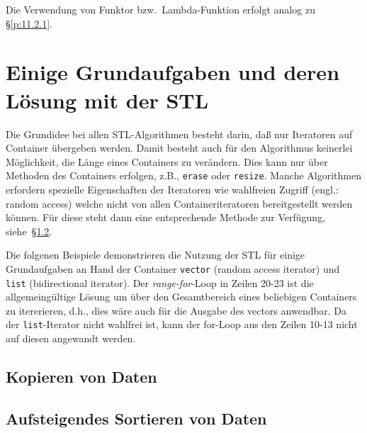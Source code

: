 Die Verwendung von Funktor bzw.\  Lambda-Funktion erfolgt analog zu \S\ref{p:11.2.1}.

\section{Einige Grundaufgaben und deren Lösung mit der STL}
\label{p:11.3}

Die Grundidee bei allen STL-Algorithmen besteht darin, daß nur Iteratoren auf Container übergeben 
werden. Damit besteht auch für den Algorithmus keinerlei Möglichkeit, die Länge eines Containers 
zu verändern. Dies kann nur über Methoden des Containers erfolgen, z.B., \verb|erase| oder \verb|resize|.{}
Manche Algorithmen erfordern spezielle Eigenschaften der Iteratoren wie wahlfreien Zugriff (engl.: random access) 
welche nicht von allen Containeriteratoren bereitgestellt werden können. Für diese steht dann eine entsprechende Methode 
zur Verfügung, siehe~\S\ref{p:11.3.2}.

Die folgenen Beispiele demonstrieren die Nutzung der STL für einige Grundaufgaben an Hand 
der Container \verb|vector| (random access iterator) und \verb|list| (bidirectional iterator). 
%
%
Der \emph{range-for}-Loop in Zeilen 20-23 ist die allgemeingültige Lösung um über 
den Gesamtbereich eines beliebigen Containers zu itererieren, d.h., dies wäre auch für die Ausgabe des 
vectors anwendbar. Da der \verb|list|-Iterator nicht wahlfrei ist, kann der for-Loop aus den Zeilen 10-13 
nicht auf diesen angewandt werden. 


\subsection{Kopieren von Daten}
\label{p:11.3.1}
%
%
%
%

\subsection{Aufsteigendes Sortieren von Daten}
\label{p:11.3.2}
%
%
%
%

